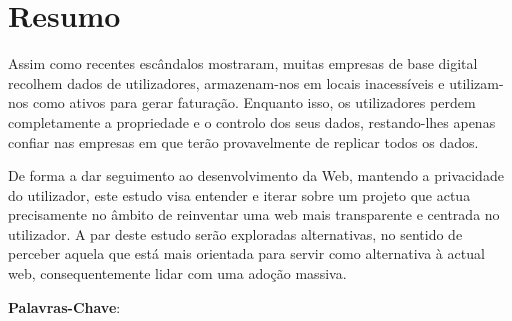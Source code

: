 \chapter*{Resumo}
Assim como recentes escândalos mostraram, muitas empresas de base digital recolhem dados de utilizadores, armazenam-nos em locais inacessíveis e utilizam-nos como ativos para gerar faturação. Enquanto isso, os utilizadores perdem completamente a propriedade e o controlo dos seus dados, restando-lhes apenas confiar nas  empresas em que terão provavelmente de replicar todos os dados.

De forma a dar seguimento ao desenvolvimento da Web, mantendo a privacidade do utilizador, este estudo visa entender e iterar sobre um projeto que actua precisamente no âmbito de reinventar uma web mais transparente e centrada no utilizador. A par deste estudo serão exploradas alternativas, no sentido de perceber aquela que está mais orientada para servir como alternativa à actual web, consequentemente lidar com uma adoção massiva.

\textbf{Palavras-Chave}: 
